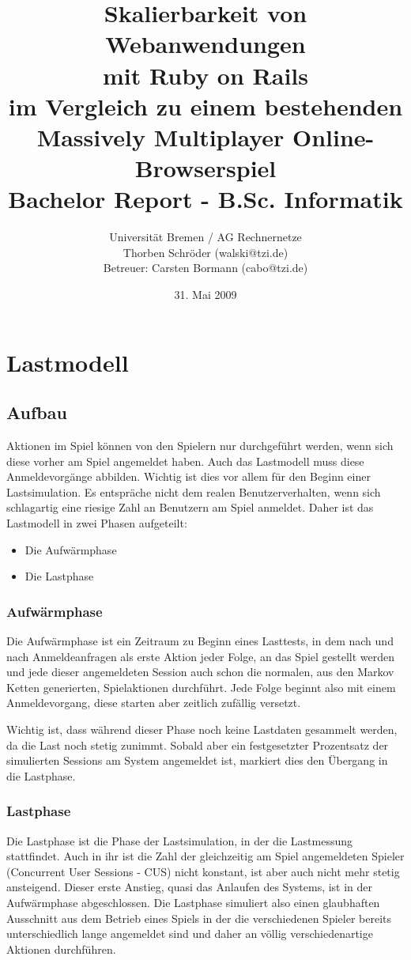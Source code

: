 \documentclass[1p]{scrartcl}
\title{Skalierbarkeit von Webanwendungen\\mit Ruby on Rails\\
\small{im Vergleich zu einem bestehenden\\Massively Multiplayer Online-Browserspiel}\\
\small{Bachelor Report - B.Sc. Informatik}\\
}
\author{Universität Bremen / AG Rechnernetze\\Thorben Schröder (walski@tzi.de)\\Betreuer: Carsten Bormann (cabo@tzi.de)}
\date{31. Mai 2009}
\begin{document}
\maketitle

\tableofcontents
\newpage

  \section{Lastmodell}
  \subsection{Aufbau}
  Aktionen im Spiel können von den Spielern nur durchgeführt werden, wenn sich
  diese vorher am Spiel angemeldet haben. Auch das Lastmodell muss diese
  Anmeldevorgänge abbilden. Wichtig ist dies vor allem für den Beginn einer
  Lastsimulation. Es entspräche nicht dem realen Benutzerverhalten, wenn sich
  schlagartig eine riesige Zahl an Benutzern am Spiel anmeldet. Daher ist das
  Lastmodell in zwei Phasen aufgeteilt:
  \begin{itemize}
    \item Die Aufwärmphase
    \item Die Lastphase
  \end{itemize}
  
  \subsubsection{Aufwärmphase}
  Die Aufwärmphase ist ein Zeitraum zu Beginn eines Lasttests, in dem nach und
  nach Anmeldeanfragen als erste Aktion jeder Folge, an das Spiel gestellt 
  werden und jede dieser angemeldeten Session auch schon die normalen, aus den 
  Markov Ketten generierten, Spielaktionen durchführt. Jede Folge beginnt also 
  mit einem Anmeldevorgang, diese starten aber zeitlich zufällig versetzt.
  
  Wichtig ist, dass während dieser Phase noch keine Lastdaten gesammelt werden,
  da die Last noch stetig zunimmt. Sobald aber ein festgesetzter Prozentsatz der
  simulierten Sessions am System angemeldet ist, markiert dies den Übergang in
  die Lastphase.
  
  \subsubsection{Lastphase}
  Die Lastphase ist die Phase der Lastsimulation, in der die Lastmessung 
  stattfindet. Auch in ihr ist die Zahl der gleichzeitig am Spiel angemeldeten
  Spieler (Concurrent User Sessions - CUS) nicht konstant, ist aber auch nicht
  mehr stetig ansteigend. Dieser erste Anstieg, quasi das Anlaufen des Systems,
  ist in der Aufwärmphase abgeschlossen. Die Lastphase simuliert also einen
  glaubhaften Ausschnitt aus dem Betrieb eines Spiels in der die verschiedenen
  Spieler bereits unterschiedlich lange angemeldet sind und daher an 
  völlig verschiedenartige Aktionen durchführen.
  
\end{document}
